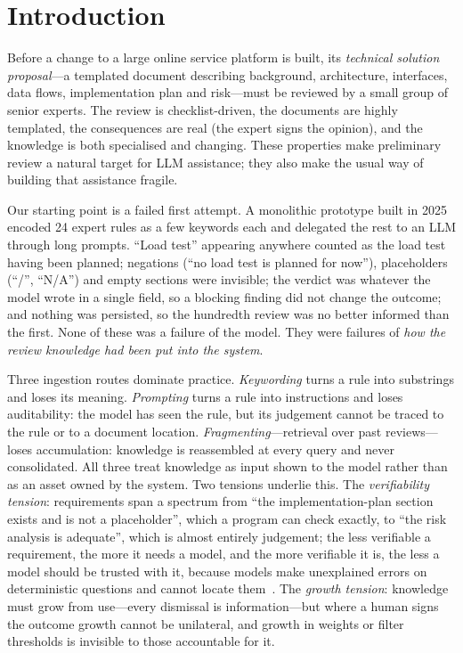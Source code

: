 \documentclass{IOS-Book-Article}
\begin{document}

\section{Introduction}

Before a change to a large online service platform is built, its \emph{technical solution proposal}---a templated document describing background, architecture, interfaces, data flows, implementation plan and risk---must be reviewed by a small group of senior experts. The review is checklist-driven, the documents are highly templated, the consequences are real (the expert signs the opinion), and the knowledge is both specialised and changing. These properties make preliminary review a natural target for LLM assistance; they also make the usual way of building that assistance fragile.

Our starting point is a failed first attempt. A monolithic prototype built in 2025 encoded 24 expert rules as a few keywords each and delegated the rest to an LLM through long prompts. ``Load test'' appearing anywhere counted as the load test having been planned; negations (``no load test is planned for now''), placeholders (``/'', ``N/A'') and empty sections were invisible; the verdict was whatever the model wrote in a single field, so a blocking finding did not change the outcome; and nothing was persisted, so the hundredth review was no better informed than the first. None of these was a failure of the model. They were failures of \emph{how the review knowledge had been put into the system}.

Three ingestion routes dominate practice. \emph{Keywording} turns a rule into substrings and loses its meaning. \emph{Prompting} turns a rule into instructions and loses auditability: the model has seen the rule, but its judgement cannot be traced to the rule or to a document location. \emph{Fragmenting}---retrieval over past reviews---loses accumulation: knowledge is reassembled at every query and never consolidated. All three treat knowledge as input shown to the model rather than as an asset owned by the system. Two tensions underlie this. The \emph{verifiability tension}: requirements span a spectrum from ``the implementation-plan section exists and is not a placeholder'', which a program can check exactly, to ``the risk analysis is adequate'', which is almost entirely judgement; the less verifiable a requirement, the more it needs a model, and the more verifiable it is, the less a model should be trusted with it, because models make unexplained errors on deterministic questions and cannot locate them~\cite{liu2024lost,huang2024self}. The \emph{growth tension}: knowledge must grow from use---every dismissal is information---but where a human signs the outcome growth cannot be unilateral, and growth in weights or filter thresholds is invisible to those accountable for it.
\end{document}

